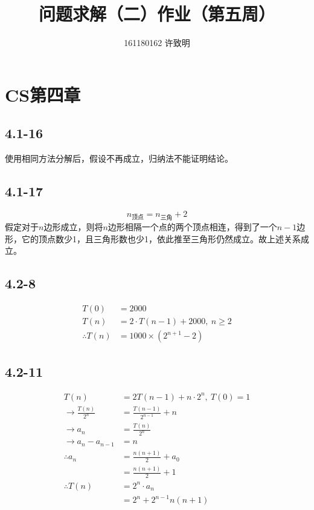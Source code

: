 \documentclass[twocolumn]{article}
\begin{document}
	\title{问题求解（二）作业（第五周）}\author{161180162 许致明}\maketitle
	\section*{CS第四章}
	\subsection*{4.1-16}
	使用相同方法分解后，假设不再成立，归纳法不能证明结论。
	\subsection*{4.1-17}
	$$n_\text{顶点}=n_\text{三角}+2$$
	假定对于$n$边形成立，则将$n$边形相隔一个点的两个顶点相连，得到了一个$n-1$边形，它的顶点数少1，且三角形数也少1，依此推至三角形仍然成立。故上述关系成立。
	\subsection*{4.2-8}
	\[
	\begin{aligned}
		T(0)&=2000\\
		T(n)&=2\cdot T(n-1)+2000,\ n\ge 2\\
		\therefore T(n)&=1000\times (2^{n+1}-2)
	\end{aligned}
	\]
	\subsection*{4.2-11}
	\[
	\begin{aligned}
		T(n)&=2T(n-1)+n\cdot 2^n,\ T(0)=1\\
		\rightarrow \frac{T(n)}{2^n}&=\frac{T(n-1)}{2^{n-1}}+n\\
		\rightarrow a_n&=\frac{T(n)}{2^n}\\
		\rightarrow a_n-a_{n-1}&=n\\
		\therefore a_n&=\frac{n(n+1)}{2}+a_0\\
		&=\frac{n(n+1)}{2}+1\\
		\therefore T(n)&=2^n\cdot a_n\\
		&=2^n+{2^{n-1}n(n+1)}
	\end{aligned}
	\]
\end{document}
